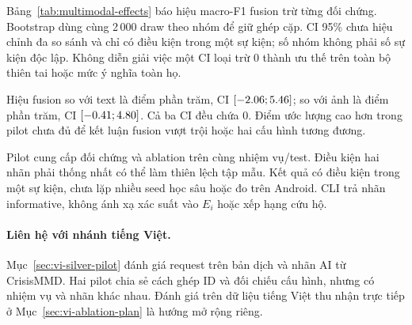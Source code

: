 Bảng~\ref{tab:multimodal-effects} báo hiệu macro-F1 fusion trừ từng đối chứng. Bootstrap dùng cùng 2\,000 draw theo \MMTestGroups{} nhóm để giữ ghép cặp. CI 95\% chưa hiệu chỉnh đa so sánh và chỉ có điều kiện trong một sự kiện; số nhóm không phải số sự kiện độc lập. Không diễn giải việc một CI loại trừ 0 thành ưu thế trên toàn bộ thiên tai hoặc mức ý nghĩa toàn họ.



Hiệu fusion so với text là \MMFusionTextDelta{} điểm phần trăm, CI $[-2.06;5.46]$; so với ảnh là \MMFusionImageDelta{} điểm phần trăm, CI $[-0.41;4.80]$. Cả ba CI đều chứa 0. Điểm ước lượng cao hơn trong pilot chưa đủ để kết luận fusion vượt trội hoặc hai cấu hình tương đương.

Pilot cung cấp đối chứng và ablation trên cùng nhiệm vụ/test. Điều kiện hai nhãn phải thống nhất có thể làm thiên lệch tập mẫu. Kết quả có điều kiện trong một sự kiện, chưa lặp nhiều seed học sâu hoặc đo trên Android. CLI trả nhãn informative, không ánh xạ xác suất vào $E_i$ hoặc xếp hạng cứu hộ.

\paragraph{Liên hệ với nhánh tiếng Việt.} Mục~\ref{sec:vi-silver-pilot} đánh giá request trên bản dịch và nhãn AI từ CrisisMMD. Hai pilot chia sẻ cách ghép ID và đối chiếu cấu hình, nhưng có nhiệm vụ và nhãn khác nhau. Đánh giá trên dữ liệu tiếng Việt thu nhận trực tiếp ở Mục~\ref{sec:vi-ablation-plan} là hướng mở rộng riêng.
